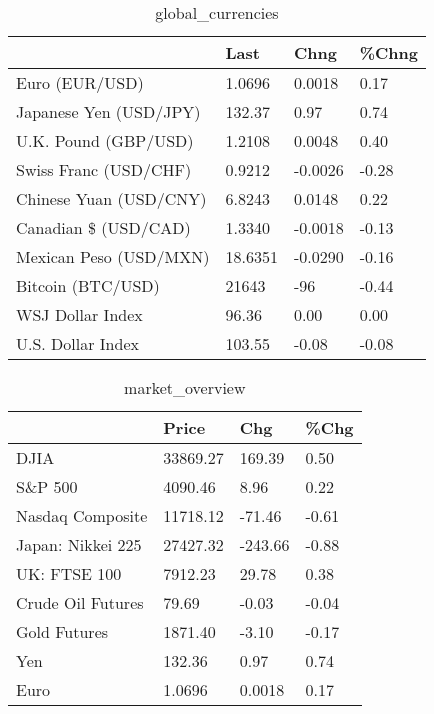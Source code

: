 \documentclass{article}%
\begin{document}
%


\begin{table}[htbp]%
\caption{global\_currencies}%
\centering%
\begin{adjustbox}{width=1\textwidth}%
\begin{tabular}{llll}
\toprule
                       &    Last &    Chng & \%Chng \\
\midrule
        Euro (EUR/USD) &  1.0696 &  0.0018 &  0.17 \\
Japanese Yen (USD/JPY) &  132.37 &    0.97 &  0.74 \\
  U.K. Pound (GBP/USD) &  1.2108 &  0.0048 &  0.40 \\
 Swiss Franc (USD/CHF) &  0.9212 & -0.0026 & -0.28 \\
Chinese Yuan (USD/CNY) &  6.8243 &  0.0148 &  0.22 \\
  Canadian \$ (USD/CAD) &  1.3340 & -0.0018 & -0.13 \\
Mexican Peso (USD/MXN) & 18.6351 & -0.0290 & -0.16 \\
     Bitcoin (BTC/USD) &   21643 &     -96 & -0.44 \\
      WSJ Dollar Index &   96.36 &    0.00 &  0.00 \\
     U.S. Dollar Index &  103.55 &   -0.08 & -0.08 \\
\bottomrule
\end{tabular}
%
\end{adjustbox}%
\end{table}

%


\begin{table}[htbp]%
\caption{market\_overview}%
\centering%
\begin{adjustbox}{width=1\textwidth}%
\begin{tabular}{llll}
\toprule
                  &    Price &     Chg &  \%Chg \\
\midrule
             DJIA & 33869.27 &  169.39 &  0.50 \\
          S\&P 500 &  4090.46 &    8.96 &  0.22 \\
 Nasdaq Composite & 11718.12 &  -71.46 & -0.61 \\
Japan: Nikkei 225 & 27427.32 & -243.66 & -0.88 \\
     UK: FTSE 100 &  7912.23 &   29.78 &  0.38 \\
Crude Oil Futures &    79.69 &   -0.03 & -0.04 \\
     Gold Futures &  1871.40 &   -3.10 & -0.17 \\
              Yen &   132.36 &    0.97 &  0.74 \\
             Euro &   1.0696 &  0.0018 &  0.17 \\
\bottomrule
\end{tabular}
%
\end{adjustbox}%
\end{table}

%
\end{document}
